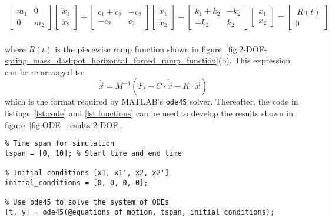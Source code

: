\documentclass[12pt,letter]{article}
\begin{document}
\begin{example}
				\begin{eqnarray}
				  \begin{bmatrix} m_1 & 0  \\  0 & m_2 \end{bmatrix}\begin{bmatrix} \ddot{x}_1 \\  \ddot{x}_2 \end{bmatrix} + \begin{bmatrix} c_1+c_2 & -c_2  \\  -c_2 & c_2 \end{bmatrix}\begin{bmatrix} \dot{x}_1 \\  \dot{x}_2 \end{bmatrix} + \begin{bmatrix} k_1+k_2 & -k_2  \\  -k_2 & k_2 \end{bmatrix}\begin{bmatrix} x_1 \\  x_2 \end{bmatrix}  = \begin{bmatrix} \ R(t) \\  0 \end{bmatrix}
				\end{eqnarray} \\
where $R(t)$ is the piecewise ramp function shown in figure~\ref{fig:2-DOF-spring_mass_dashpot_horizontal_forced_ramp_function}(b). This expression can be re-arranged to:				
\begin{equation}
\ddot{\vec{x}} = M^{-1}(F_t - C \cdot \dot{\vec{x}} -K \cdot \vec{x})
\end{equation}
which is the format required by MATLAB's \texttt{ode45} solver. Thereafter, the code in listings~\ref{lst:code} and \ref{lst:functions} can be used to develop the results shown in figure~\ref{fig:ODE_results-2-DOF}. 


			


	

\begin{lstlisting}
% Time span for simulation
tspan = [0, 10]; % Start time and end time

% Initial conditions [x1, x1', x2, x2']
initial_conditions = [0, 0, 0, 0];

% Use ode45 to solve the system of ODEs
[t, y] = ode45(@equations_of_motion, tspan, initial_conditions);


\end{lstlisting}
\end{example}
\end{document}

